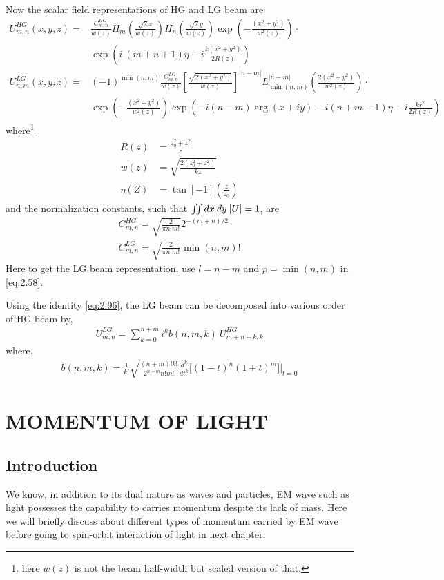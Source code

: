 \documentclass[11pt,a4paper]{article}
\numberwithin{equation}{section}
\begin{document}
Now the scalar field representations of HG and LG beam are
\begin{align}
	U_{m,n}^{HG}(x,y,z)=& \frac{C_{m,n}^{HG}}{w(z)} H_m\left(\frac{\sqrt{2} x}{w(z)}\right) H_n\left(\frac{\sqrt{2} y}{w(z)}\right)\exp( -\frac{(x^2+y^2)}{w^2(z)}) \cdot\nonumber\\ 
	&\exp( i\:(m+n+1)\eta -i\frac{k(x^2+y^2)}{2R(z)}) \\
	U_{n,m}^{LG}(x,y,z)=&(-1)^{\min(n,m)}\frac{C_{m,n}^{LG}}{w(z)} \left[\frac{\sqrt{2(x^2+y^2)}}{w(z)}\right]^{|n-m|} L_{\min(n,m)}^{|n-m|}\left(\frac{2(x^2+y^2)}{w^2(z)}\right)\cdot\nonumber\\&\exp(-\frac{(x^2+y^2)}{w^2(z)}) \exp(-i(n-m)\arg(x+iy)-i(n+m-1)\eta-i\frac{kr^2}{2R(z)}) 
\end{align}
where\footnote{here $w(z)$ is not the beam half-width but scaled version of that.}
\begin{align}
	R(z)&= \frac{z_0^2+z^2}{z}\\
	w(z)&= \sqrt{\frac{2(z_0^2+z^2)}{kz}}\\
	\eta(Z)&= \tan[-1](\frac{z}{z_0})
\end{align}
and the normalization constants, such that $\iint dx\:dy\: \abs{U}=1$, are
\begin{align}
	C_{m,n}^{HG}=\sqrt{\frac{2}{\pi n!m!}}2^{-(m+n)/2}\\
	C_{m,n}^{LG}=\sqrt{\frac{2}{\pi n!m!}}\min(n,m)!
\end{align}
Here to get the LG beam representation, use $l=n-m$ and $p=\min(n,m)$ in \ref{eq:2.58}. \cite{allen 99}

Using the identity \ref{eq:2.96}, the LG beam can be decomposed into various order of HG beam by, \cite{beijers allen 93}
\begin{align}
	U_{m,n}^{LG}= \sum_{k=0}^{n+m}i^k b(n,m,k)\: U_{m+n-k,k}^{HG}
\end{align}
where,
\begin{align}
	b(n,m,k)=\frac{1}{k!}\sqrt{\frac{(n+m)!k!}{2^{n+m}n!m!}} \frac{d^k}{dt^k}\big[(1-t)^n(1+t)^m \big] \bigg|_{t=0}
\end{align}
\clearpage


\section{MOMENTUM OF LIGHT}
\subsection{Introduction}
We know, in addition to its dual nature as waves and particles, EM wave such as light possesses the capability to carries momentum despite its lack of mass. Here we will briefly discuss about different types of momentum carried by EM wave before going to spin-orbit interaction of light in next chapter.
\end{document}
